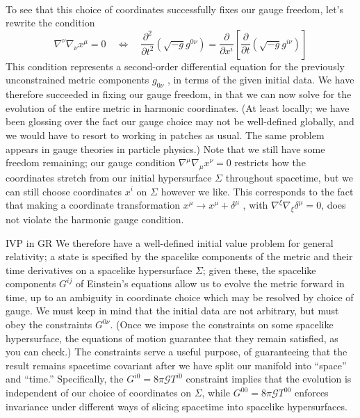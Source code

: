  \\
 To see that this choice of coordinates successfully fixes our gauge freedom, let’s rewrite
 the condition 
 \begin{equation}
 \nabla^\nu \nabla_\nu x^\mu = 0 \quad \Leftrightarrow \quad \frac{\partial^2}{\partial t^2}(\sqrt{-g} g^{0 \nu}) = \frac{\partial}{\partial x^i}\left[\frac{\partial}{\partial t} (\sqrt{-g} g^{i \nu})\right]
 \end{equation}
 This condition represents a second-order differential equation for the previously unconstrained metric components $g_{0ν}$ , in terms of the given initial data. We have therefore
 succeeded in fixing our gauge freedom, in that we can now solve for the evolution of the
 entire metric in harmonic coordinates. (At least locally; we have been glossing over the fact
 our gauge choice may not be well-defined globally, and we would have to resort to working
 in patches as usual. The same problem appears in gauge theories in particle physics.) Note
 that we still have some freedom remaining; our gauge condition $\nabla^\mu \nabla_\mu x^\nu =0$ restricts how the
 coordinates stretch from our initial hypersurface $Σ$ throughout spacetime, but we can still
 choose coordinates $x^i$ on $Σ$ however we like. This corresponds to the fact that making a
 coordinate transformation $x^μ → x^μ + δ^μ$ , with $\nabla^\xi \nabla_\xi δ^μ = 0$, does not violate the harmonic gauge
 condition.\\
 \begin{mybox}{IVP in GR}
 	We therefore have a well-defined initial value problem for general relativity; a state is
 	specified by the spacelike components of the metric and their time derivatives on a spacelike
 	hypersurface $Σ$; given these, the spacelike components $G^{ij}$ of Einstein’s equations allow
 	us to evolve the metric forward in time, up to an ambiguity in coordinate choice which
 	may be resolved by choice of gauge. We must keep in mind that the initial data are not
 	arbitrary, but must obey the constraints $G^{0\nu}$. (Once we impose the constraints on some
 	spacelike hypersurface, the equations of motion guarantee that they remain satisfied, as you
 	can check.) The constraints serve a useful purpose, of guaranteeing that the result remains
 	spacetime covariant after we have split our manifold into “space” and “time.” Specifically,
 	the $G^{i0} = 8π\mathcal{G} T^{i0}$ constraint implies that the evolution is independent of our choice of
 	coordinates on $Σ$, while $G^{00} = 8π\mathcal{G} T^{00}$ enforces invariance under different ways of slicing
 	spacetime into spacelike hypersurfaces.
 \end{mybox}
 
